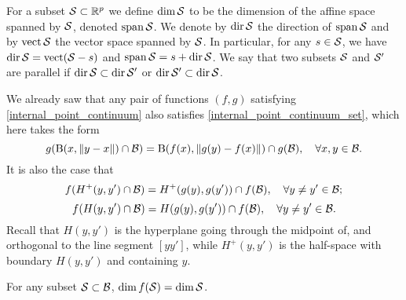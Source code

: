 \documentclass[twoside, 11pt]{article}
\begin{document}
For a subset $\mathcal{S} \subset \mathbb{R}^p$ we define $\dim \mathcal{S}$ to be the dimension of the affine space spanned by $\mathcal{S}$, denoted $\operatorname{span} \mathcal{S}$. We denote by $\operatorname{dir} \mathcal{S}$ the direction of $\operatorname{span}\mathcal{S}$ and by $\operatorname{vect} \mathcal{S}$ the vector space spanned by $\mathcal{S}$. In particular, for any $s \in \mathcal{S}$, we have $\operatorname{dir} \mathcal{S} = \operatorname{vect}(\mathcal{S}-s)$ and $\operatorname{span}\mathcal{S} = s + \operatorname{dir}\mathcal{S}$. We say that two subsets $\mathcal{S}$ and $\mathcal{S}'$ are parallel if $\operatorname{dir} \mathcal{S} \subset \operatorname{dir} \mathcal{S}'$ or $\operatorname{dir} \mathcal{S}' \subset \operatorname{dir} \mathcal{S}$.

We already saw that any pair of functions $(f,g)$ satisfying \eqref{internal_point_continuum} also satisfies \eqref{internal_point_continuum_set}, which here takes the form 
\begin{equation} \label{easy-iii}
g(\mathrm{B}(x,\|y-x\|)\cap \mathcal{B}) = \mathrm{B}(f(x),\|g(y) - f(x)\|) \cap g(\mathcal{B}), \quad \forall x,y \in \mathcal{B}.
\end{equation}
It is also the case that 
\begin{equation} \label{easy-i}
f(H^+(y,y') \cap \mathcal{B}) = H^+(g(y),g(y')) \cap f(\mathcal{B}), \quad \forall y \ne y' \in \mathcal{B};
\end{equation}
\begin{equation} \label{easy-ii}
f(H(y,y') \cap \mathcal{B}) = H(g(y),g(y')) \cap f(\mathcal{B}), \quad \forall y \ne y' \in \mathcal{B}.
\end{equation}
Recall that $H(y,y')$ is the hyperplane going through the midpoint of, and orthogonal to the line segment $[yy']$, while $H^+(y,y')$ is the half-space with boundary $H(y,y')$ and containing $y$.

\begin{lemma} \label{lem:fdimb} 
For any subset $\mathcal{S} \subset \mathcal{B}$, $\dim f(\mathcal{S}) = \dim \mathcal{S}$.
\end{lemma}
\end{document}
